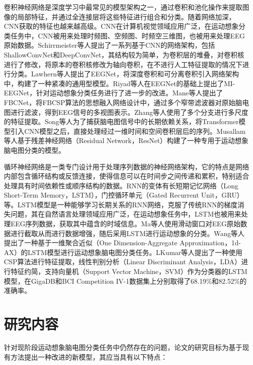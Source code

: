 卷积神经网络是深度学习中最常见的模型架构之一，通过卷积和池化操作来提取图像的局部特征，并通过全连接层将这些特征进行组合和分类。随着网络加深，CNN获取的特征也越来越高级。CNN在计算机视觉领域应用广泛，在运动想象分类任务中，CNN被用来处理时频图、空频图、时频空三维图，也被用来处理EEG原始数据。Schirrmeister等人\cite{schirrmeister2017deep}提出了一系列基于CNN的网络架构，包括ShallowConvNet和DeepConvNet，其结构较为简单，为卷积层的堆叠，对卷积核进行了修改，将原本的卷积核修改为轴向卷积，在不进行人工特征提取的情况下进行分类。Lawhern等人\cite{lawhern2018eegnet}提出了EEGNet，将深度卷积和可分离卷积引入网络架构中，构建了一种紧凑的通用型模型。Riyad等人\cite{riyad2021mi}在EEGNet的基础上提出了MI-EEGNet，针对运动想象分类任务进行了进一步的改进。Mane等人\cite{mane2021fbcnet}提出了FBCNet，将FBCSP算法的思想融入网络设计中，通过多个窄带滤波器对原始脑电图进行滤波，得到EEG信号的多视图表示。Zhang等人\cite{zhang2021eeg}使用了多个分支进行多尺度的特征提取。Song等人\cite{song2022eeg}为了捕获脑电图信号中的长期依赖关系，将Transformer\cite{vaswani2017attention}模型引入CNN模型之后，直接处理经过一维时间和空间卷积层后的序列。Musallam等人\cite{musallam2021electroencephalography}基于残差神经网络（Residual Network，ResNet）\cite{he2016deep}构建了一种专用于运动想象脑电图分类的模型。

循环神经网络是一类专门设计用于处理序列数据的神经网络架构，它的特点是网络内部包含循环结构或反馈连接，使得信息可以在时间步之间传递和累积，特别适合处理具有时间依赖性或顺序结构的数据。RNN的变体有长短期记忆网络（Long Short-Term Memory，LSTM），门控循环单元（Gated Recurrent Unit，GRU）等。LSTM模型是一种能够学习长期关系的RNN网络，克服了传统RNN的梯度消失问题，其在自然语言处理领域应用广泛，在运动想象任务中，LSTM也被用来处理EEG序列数据，获取其中蕴含的时域信息。Ma等人\cite{ma2018improving}使用滑动窗口对EEG原始数据进行截取从而进行数据增强，随后采用LSTM进行运动想象的分类。Wang等人\cite{wang2018lstm}提出了一种基于一维聚合近似（One Dimension-Aggregate Approximation，1d-AX）的LSTM模型进行运动想象脑电图分类任务。LKumar等人\cite{kumar2019brain}提出了一种使用CSP算法进行特征提取，线性判别分析（Linear Discriminant Analysis，LDA）进行特征约简，支持向量机（Support Vector Machine，SVM）作为分类器的LSTM模型，在GigaDB\cite{cho2017eeg}和BCI Competition IV-1\cite{blankertz2007non}数据集上分别取得了68.19\%和82.52\%的准确率。

\section{研究内容}

针对现阶段运动想象脑电图分类任务中仍然存在的问题，论文的研究目标为基于现有方法提出一种改进的新模型，其应当具有以下特点：

